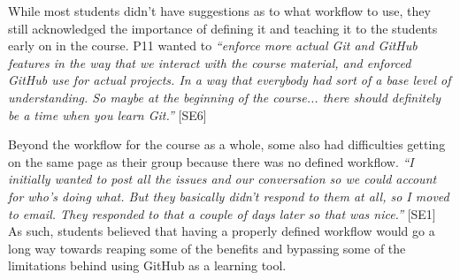 While most students didn't have suggestions as to what workflow to use, they still acknowledged the importance of defining it and teaching it to the students early on in the course. P11 wanted to \textit{``enforce more actual Git and GitHub features in the way that we interact with the course material, and enforced GitHub use for actual projects. In a way that everybody had sort of a base level of understanding. So maybe at the beginning of the course... there should definitely be a time when you learn Git.''} [SE6]

Beyond the workflow for the course as a whole, some also had difficulties getting on the same page as their group because there was no defined workflow. \textit{``I initially wanted to post all the issues and our conversation so we could account for who's doing what. But they basically didn't respond to them at all, so I moved to email. They responded to that a couple of days later so that was nice.''} [SE1] As such, students believed that having a properly defined workflow would go a long way towards reaping some of the benefits and bypassing some of the limitations behind using GitHub as a learning tool.





